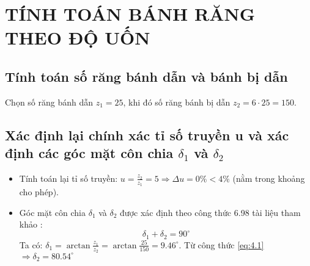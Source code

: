    \section{TÍNH TOÁN BÁNH RĂNG THEO ĐỘ UỐN}
        \subsection{Tính toán số răng bánh dẫn và bánh bị dẫn}
            \hspace*{0.6cm}Chọn số răng bánh dẫn $z_1 = 25$, khi đó số răng bánh bị dẫn $z_2 = 6 \cdot 25 = 150$.
        \subsection{Xác định lại chính xác tỉ số truyền u và xác định các góc mặt côn chia $\delta_1$ và $\delta_2$}
            \begin{itemize}
                \item Tính toán lại tỉ số truyền:
                    $u = \frac{z_2}{z_1} = 5 \Rightarrow \Delta u = 0\% < 4\%$ (nằm trong khoảng cho phép).
                \item Góc mặt côn chia $\delta_1$ và $\delta_2$ được xác định theo công thức 6.98 tài liệu tham khảo \cite{gtctm}:
                    \begin{equation}
                        \delta_1 + \delta_2 = 90^{\circ}
                        \label{eq:4.1}
                    \end{equation}
                    Ta có: $\delta_1 = \arctan{\frac{z_1}{z_2}} = \arctan{\frac{25}{150}} = 9.46^{\circ}$. Từ công thức \ref{eq:4.1} $\Rightarrow \delta_2 = 80.54^{\circ}$ \\
            \end{itemize}
